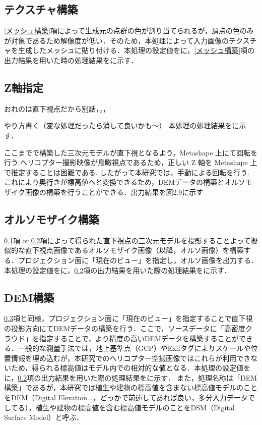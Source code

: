    \subsection{テクスチャ構築}
      \label{テクスチャ構築}
      \ref{メッシュ構築}項によって生成元の点群の色が割り当てられるが，頂点の色のみが対象であるため解像度が低い．そのため，本処理によって入力画像のテクスチャを生成したメッシュに貼り付ける．本処理の設定値を\fref{}に，\ref{メッシュ構築}項の出力結果を用いた時の処理結果を\fref{}に示す．

    \subsection{Z軸指定}
      \label{Z軸指定}
      おれのは直下視点だから別話，，，

      やり方書く（変な処理だったら消して良いかも〜）
      本処理の処理結果を\fref{}に示す．




      ここまでで構築した三次元モデルが直下視となるよう，Metashape 上にて回転を行う.ヘリコプター撮影映像が鳥瞰視点であるため，正しい Z 軸を Metashape 上で推定することは困難である. したがって本研究では，手動による回転を行う.
      これにより奥行きが標高値へと変換できるため，DEMデータの構築とオルソモザイク画像の構築を行うことができる．出力結果を図2.9に示す

    \subsection{オルソモザイク構築}
      \label{オルソモザイク構築}
      \ref{テクスチャ構築}項 or \ref{Z軸指定}項によって得られた直下視点の三次元モデルを投影することよって擬似的な直下視点画像であるオルソモザイク画像（以降，オルソ画像）を構築する．プロジェクション面に「現在のビュー」を指定し，オルソ画像を出力する．本処理の設定値を\fref{}に，\ref{Z軸指定}項の出力結果を用いた際の処理結果を\fref{}に示す．
      
    \subsection{DEM構築}
      \label{DEM構築}
      \ref{オルソモザイク構築}項と同様，プロジェクション面に「現在のビュー」を指定することで直下視の投影方向にてDEMデータの構築を行う．ここで，ソースデータに「高密度クラウド」を指定することで，より精度の高いDEMデータを構築することができる．一般的な測量手法では，地上基準点（GCP）やExifタグによりスケールや位置情報を埋め込むが，本研究でのヘリコプター空撮画像ではこれらが利用できないため，得られる標高値はモデル内での相対的な値となる．本処理の設定値を\fref{}に，\ref{Z軸指定}項の出力結果を用いた際の処理結果を\fref{}に示す．
      また，処理名称は「DEM構築」であるが，本研究では植生や建物の標高値を含まない標高値モデルのことをDEM（Digital Elevation...，どっかで前述してあれば良い，多分入力データでしてる），植生や建物の標高値を含む標高値モデルのことをDSM（Digital Surface Model）と呼ぶ．


